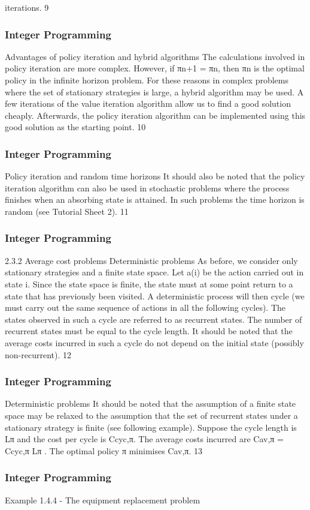 \begin{frame}
iterations.
9 \end{frame}  \begin{frame} \frametitle{Integer Programming}     
Advantages of policy iteration and hybrid algorithms
The calculations involved in policy iteration are more complex.
However, if πn+1 = πn, then πn is the optimal policy in the infinite
horizon problem.
For these reasons in complex problems where the set of stationary
strategies is large, a hybrid algorithm may be used.
A few iterations of the value iteration algorithm allow us to find a
good solution cheaply. Afterwards, the policy iteration algorithm
can be implemented using this good solution as the starting point.
10 \end{frame}  \begin{frame} \frametitle{Integer Programming}     
Policy iteration and random time horizons
It should also be noted that the policy iteration algorithm can also
be used in stochastic problems where the process finishes when an
absorbing state is attained. In such problems the time horizon is
random (see Tutorial Sheet 2).
11 \end{frame}  \begin{frame} \frametitle{Integer Programming}     
2.3.2 Average cost problems
Deterministic problems As before, we consider only stationary
strategies and a finite state space.
Let a(i) be the action carried out in state i.
Since the state space is finite, the state must at some point return
to a state that has previously been visited. A deterministic process
will then cycle (we must carry out the same sequence of actions in
all the following cycles).
The states observed in such a cycle are referred to as recurrent
states. The number of recurrent states must be equal to the cycle
length.
It should be noted that the average costs incurred in such a cycle
do not depend on the initial state (possibly non-recurrent).
12 \end{frame}  \begin{frame} \frametitle{Integer Programming}     
Deterministic problems
It should be noted that the assumption of a finite state space may
be relaxed to the assumption that the set of recurrent states under
a stationary strategy is finite (see following example).
Suppose the cycle length is Lπ and the cost per cycle is Ccyc,π.
The average costs incurred are
Cav,π =
Ccyc,π
Lπ
.
The optimal policy π minimises Cav,π.
13 \end{frame}  \begin{frame} \frametitle{Integer Programming}     
Example 1.4.4 - The equipment replacement problem

\end{frame}
